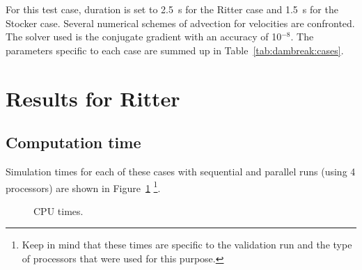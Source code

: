 For this test case, duration is set to 2.5~s for the Ritter case and
1.5~s for the Stocker case.
Several numerical schemes of advection for velocities are confronted.
The solver used is the conjugate gradient with an accuracy of 10$^{-8}$.
The parameters specific to each case are summed up in
Table~\ref{tab:dambreak:cases}.
\begin{table}[H]
  \caption{List of the simulation parameters used for the six cases tested in the Ritter and Stokes cases.}
  \label{tab:dambreak:cases}
\end{table}

\section{Results for Ritter}


\subsection{Computation time}

Simulation times for each of these cases with sequential and parallel runs
(using 4 processors) are shown in Figure~\ref{fig:ritter:cputime}
\footnote{Keep in mind that these times
are specific to the validation run and the type of processors that were used for this purpose.}.

\begin{figure}[H]
  \centering
  \caption{CPU times.}\label{fig:ritter:cputime}
\end{figure}

